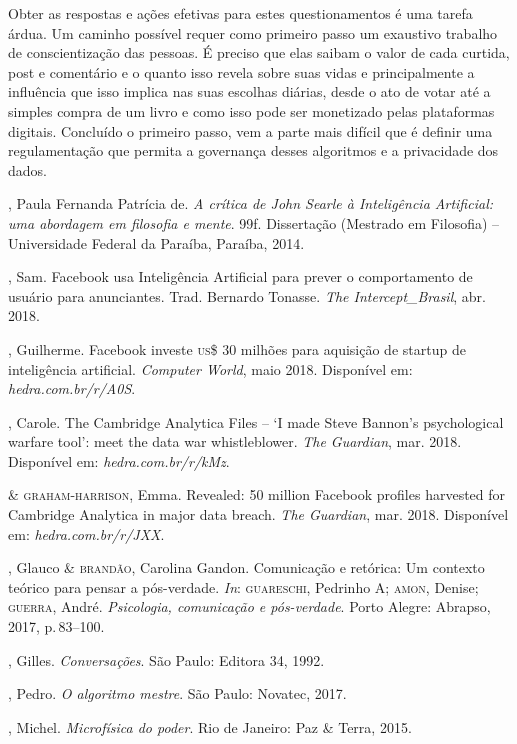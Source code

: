 Obter as respostas e ações efetivas para estes questionamentos é uma
tarefa árdua. Um caminho possível requer como primeiro passo um
exaustivo trabalho de conscientização das pessoas. É preciso que elas
saibam o valor de cada curtida, post e comentário e o quanto isso revela
sobre suas vidas e principalmente a influência que isso implica nas suas
escolhas diárias, desde o ato de votar até a simples compra de um livro
e como isso pode ser monetizado pelas plataformas digitais. Concluído o
primeiro passo, vem a parte mais difícil que é definir uma
regulamentação que permita a governança desses algoritmos e a
privacidade dos dados.

\begin{bibliohedra}
, Paula Fernanda Patrícia de. \textit{A crítica de John Searle à
Inteligência Artificial: uma abordagem em filosofia e mente}. 99f. Dissertação (Mestrado em Filosofia) -- Universidade Federal da Paraíba, Paraíba, 2014.

, Sam. Facebook usa Inteligência Artificial para prever o
comportamento de usuário para anunciantes. Trad. Bernardo
Tonasse. \textit{The Intercept\_Brasil}, abr. 2018.

, Guilherme. Facebook investe \textsc{us}\$ 30 milhões para
aquisição de startup de inteligência artificial. \textit{Computer World}, maio 2018. Disponível em: \textit{hedra.com.br/r/A0S}.

, Carole. The Cambridge Analytica Files -- `I made
Steve Bannon's psychological warfare tool': meet the data war
whistleblower. \textit{The Guardian}, mar. 2018. Disponível em: \textit{hedra.com.br/r/kMz}.

\titidem\mbox{} \& \textsc{graham-harrison}, Emma. Revealed: 50 million
Facebook profiles harvested for Cambridge Analytica in major data
breach. \textit{The Guardian}, mar. 2018. Disponível em: \textit{hedra.com.br/r/JXX}.

, Glauco \& \textsc{brandão}, Carolina Gandon. Comunicação e
retórica: Um contexto teórico para pensar a pós-verdade. \textit{In}:
\textsc{guareschi}, Pedrinho A; \textsc{amon}, Denise; \textsc{guerra}, André. \textit{Psicologia, comunicação e pós-verdade}. Porto Alegre: Abrapso, 2017, p.\,83--100.

, Gilles. \textit{Conversações}. São Paulo: Editora 34, 1992.

, Pedro. \textit{O algoritmo mestre}. São Paulo: Novatec, 2017.

, Michel. \textit{Microfísica do poder}. Rio de Janeiro: Paz \&
Terra, 2015.


\end{bibliohedra}
